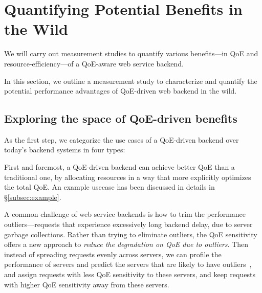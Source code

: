 \section{Quantifying Potential Benefits in the Wild}
\begin{task}
We will carry out measurement studies to quantify various benefits---in QoE and resource-efficiency---of a QoE-aware web service backend.
\end{task}

In this section, we outline a measurement study to characterize and quantify the potential performance advantages of QoE-driven web backend in the wild.


\subsection{Exploring the space of QoE-driven benefits}

As the first step,  we categorize the use cases of a QoE-driven backend over today's backend systems in four types:

First and foremost, a QoE-driven backend can achieve better QoE than a traditional one, by allocating resources in a way that more explicitly optimizes the total QoE. 
An example usecase has been discussed in details in \S\ref{subsec:example}.
    
A common challenge of web service backends is how to trim the performance outliers---requests that experience excessively long backend delay, \eg due to server garbage collections. 
Rather than trying to eliminate outliers, the QoE sensitivity offers a new approach to {\em reduce the degradation on QoE due to outliers}.
Then instead of spreading requests evenly across servers, we can profile the performance of servers and predict the servers that are likely to have outliers~\cite{ganesh's trimming}, and assign requests with less QoE sensitivity to these servers, and keep requests with higher QoE sensitivity away from these servers. 
    
